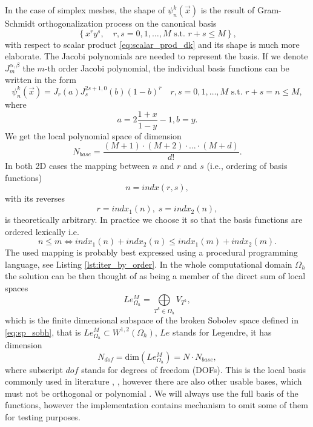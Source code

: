 In the case of simplex meshes, the shape of $\psi_n^k(\vec{x})$ is the result of
Gram-Schmidt orthogonalization process on the canonical basis
\begin{equation}
    \label{eq:tens_canon}
    \left\{ x^ry^s,  \quad r, s = 0,1, \dots, M \text{ s.t. } r + s \leq M\right\},
\end{equation}
with respect to scalar product \eqref{eq:scalar_prod_dk}
and its shape is much more elaborate. The Jacobi polynomials are needed to
represent the basis. If we denote $J^{\alpha, \beta}_m$ the $m$-th order
Jacobi polynomial, the individual basis functions can be written in the form
\cite{Hesthaven2008}
\begin{equation}
\psi_n^k(\vec{x}) = J_r(a)J^{2s+1, 0}_s(b)(1 - b)^r\quad r, s = 0,1, \dots,
M \text{ s.t. } r + s = n \leq M,
\end{equation}
where
\begin{equation}
a = 2 \frac{1 + x}{1 - y} - 1, b = y.
\end{equation}
We get the local polynomial space of dimension
\begin{equation}
N_{base} =  \frac{(M + 1) \cdot (M + 2) \cdot ... \cdot (M + d)}{d!}.
\end{equation}
In both 2D cases the mapping between $n$ and $r$ and $s$ (i.e., ordering of
basis functions)
\begin{equation}
\label{eq:bindx}
n = indx(r, s),
\end{equation}
with its reverses
\begin{equation}
r = indx_1(n),\; s = indx_2(n),
\end{equation}
is theoretically arbitrary. In practice we choose it so that the basis
functions are ordered lexically i.e.
\begin{equation}
n \leq m \Leftrightarrow indx_1(n) + indx_2(n) \leq indx_1(m) + indx_2(m).
\end{equation}
The used mapping is probably best expressed using a procedural programming language,
see Listing \ref{lst:iter_by_order}.
In the whole computational domain $\Omega_h$ the solution can be then thought
of as being a member of the direct sum of local spaces
\begin{equation}
Le_{\Omega_h}^{M} = \bigoplus\limits_{T^k \in \Omega_h} V_{T^k},
\end{equation}
which is the finite dimensional subspace of the broken Sobolev space defined in
\eqref{eq:sp_sobh},
that is $Le_{\Omega_h}^{M} \subset  W^{1,2}(\Omega_h)$, $Le$ stands for Legendre, it has
dimension
\begin{equation}
\label{eq:dim_legh}
N_{dof} = \text{dim}(Le_{\Omega_h}^{M}) = N\cdot N_{base},
\end{equation}
where subscript $dof$ stands for degrees of freedom (DOFs). This is the local basis commonly
used in literature \cite{Hesthaven2008}, \cite{Bokhove2008}, however there are also other
usable bases, which must not be orthogonal or polynomial \cite{Yuan2006}. We will always
use the full basis of the functions, however the implementation contains mechanism to omit
some of them for testing purposes.

